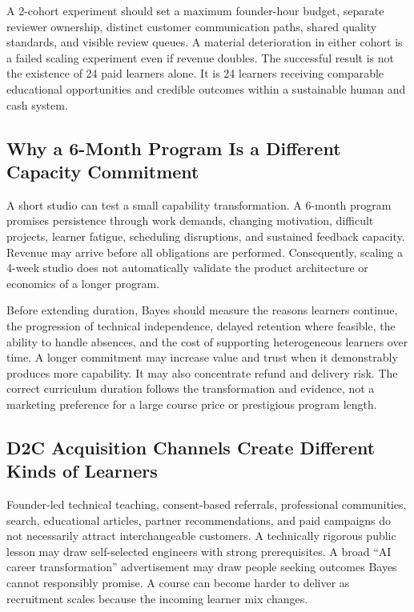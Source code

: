 A 2-cohort experiment should set a maximum founder-hour budget, separate reviewer ownership, distinct customer communication paths, shared quality standards, and visible review queues. A material deterioration in either cohort is a failed scaling experiment even if revenue doubles. The successful result is not the existence of 24 paid learners alone. It is 24 learners receiving comparable educational opportunities and credible outcomes within a sustainable human and cash system.

\subsection{Why a 6-Month Program Is a Different Capacity Commitment}
\label{sec:six_month_program_capacity_commitment}

A short studio can test a small capability transformation. A 6-month program promises persistence through work demands, changing motivation, difficult projects, learner fatigue, scheduling disruptions, and sustained feedback capacity. Revenue may arrive before all obligations are performed. Consequently, scaling a 4-week studio does not automatically validate the product architecture or economics of a longer program.

Before extending duration, Bayes should measure the reasons learners continue, the progression of technical independence, delayed retention where feasible, the ability to handle absences, and the cost of supporting heterogeneous learners over time. A longer commitment may increase value and trust when it demonstrably produces more capability. It may also concentrate refund and delivery risk. The correct curriculum duration follows the transformation and evidence, not a marketing preference for a large course price or prestigious program length.

\subsection{D2C Acquisition Channels Create Different Kinds of Learners}
\label{sec:d2c_acquisition_channels_learner_mix}

Founder-led technical teaching, consent-based referrals, professional communities, search, educational articles, partner recommendations, and paid campaigns do not necessarily attract interchangeable customers. A technically rigorous public lesson may draw self-selected engineers with strong prerequisites. A broad ``AI career transformation'' advertisement may draw people seeking outcomes Bayes cannot responsibly promise. A course can become harder to deliver as recruitment scales because the incoming learner mix changes.

